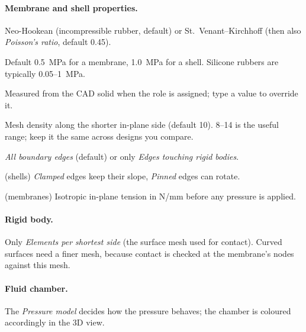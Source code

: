 \documentclass[11pt,a4paper]{article}
\begin{document}
\paragraph{Membrane and shell properties.}
\begin{description}[font=\normalfont\itshape,leftmargin=1.5em]
\item[Material model] Neo-Hookean (incompressible rubber, default) or St.\ Venant--Kirchhoff (then also
  \emph{Poisson's ratio}, default 0.45).
\item[Young's modulus] Default 0.5~MPa for a membrane, 1.0~MPa for a shell. Silicone rubbers are typically
  0.05--1~MPa.
\item[Thickness] Measured from the CAD solid when the role is assigned; type a value to override it.
\item[Elements per shortest side] Mesh density along the shorter in-plane side (default 10). 8--14 is the useful
  range; keep it the same across designs you compare.
\item[Fixed edges] \emph{All boundary edges} (default) or only \emph{Edges touching rigid bodies}.
\item[Edge support] (shells) \emph{Clamped} edges keep their slope, \emph{Pinned} edges can rotate.
\item[Pre-tension] (membranes) Isotropic in-plane tension in N/mm before any pressure is applied.
\end{description}

\paragraph{Rigid body.} Only \emph{Elements per shortest side} (the surface mesh used for contact). Curved surfaces
need a finer mesh, because contact is checked at the membrane's nodes against this mesh.

\paragraph{Fluid chamber.} The \emph{Pressure model} decides how the pressure behaves; the chamber is coloured
accordingly in the 3D view.
\end{document}
